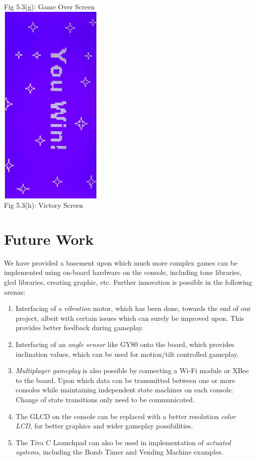 \documentclass[a4paper,12pt,oneside]{book}
\begin{document}
\begin{center}
{\small Fig 5.3(g): Game Over Screen} \\
\includegraphics[width=5cm, height=10cm, angle  = 90]{BreakoutImages/victoryScreen} \\
{\small Fig 5.3(h): Victory Screen} \\
\end{center}

\chapter{Future Work}
\qquad We have provided a basement upon which much more complex games can be implemented using on-board hardware on the console, including tone libraries, glcd libraries, creating graphic, etc. Further innovation is possible in the following arenas:
\begin{enumerate}
\item Interfacing of a \textit{vibration} motor, which has been done, towards the end of our project, albeit with certain issues which can surely be improved upon. This provides better feedback during gameplay.
\item Interfacing of an \textit{angle sensor} like GY80 onto the board, which provides inclination values, which can be used for motion/tilt controlled gameplay.
\item \textit{Multiplayer gameplay} is also possible by connecting a Wi-Fi module or XBee to the board. Upon which data can be transmitted between one or more consoles while maintaining independent state machines on each console. Change of state transitions only need to be communicated.
\item The GLCD on the console can be replaced with a better resolution \textit{color LCD}, for better graphics and wider gameplay possibilities.
\item The Tiva C Launchpad can also be used in implementation of \textit{actuated systems}, including the Bomb Timer and Vending Machine examples.
\end{enumerate}
\end{document}
